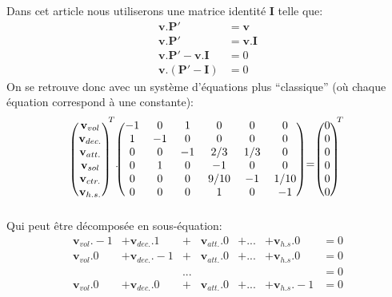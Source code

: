 \documentclass[letterpaper]{article}
\begin{document}
      Dans cet article nous utiliserons une matrice identité $\mathbf{I}$ telle que:
      \begin{align*}
       \mathbf{v} . \mathbf{P}' &= \mathbf{v}\\
       \mathbf{v} . \mathbf{P}' &= \mathbf{v} . \mathbf{I}\\
       \mathbf{v} . \mathbf{P}' - \mathbf{v}. \mathbf{I} &= 0\\
       \mathbf{v} . (\mathbf{P}' - \mathbf{I}) &= 0
      \end{align*}
      On se retrouve donc avec un système d'équations plus ``classique'' (où chaque
      équation correspond à une constante):
      $$\begin{blockarray}{(c)}
	  \mathbf{v}_{vol}\\
	  \mathbf{v}_{dec.}\\
	  \mathbf{v}_{att.}\\
	  \mathbf{v}_{sol}\\
	  \mathbf{v}_{ctr.}\\
	  \mathbf{v}_{h.s.}
	\end{blockarray}^T .
	\begin{blockarray}{(cccccc)}
	    -1 & 0  & 1  & 0    & 0   & 0    \\
	    1  & -1 & 0  & 0    & 0   & 0    \\
	    0  & 0  & -1 & 2/3  & 1/3 & 0    \\
	    0  & 1  & 0  & -1   & 0   & 0    \\
	    0  & 0  & 0  & 9/10 & -1  & 1/10 \\
	    0  & 0  & 0  & 1    & 0   & -1    \\
	\end{blockarray}
	=
	\begin{blockarray}{(c)}
	  0\\
	  0\\
	  0\\
	  0\\
	  0\\
	  0
	\end{blockarray}^T$$
      Qui peut être décomposée en sous-équation:
      \begin{align*}
       \mathbf{v}_{vol} . -1 &+ \mathbf{v}_{dec.} . 1 &+ &\mathbf{v}_{att.} . 0 &+ ... &+ \mathbf{v}_{h.s} . 0 &= 0\\
       \mathbf{v}_{vol} . 0 &+ \mathbf{v}_{dec.} . -1 &+ &\mathbf{v}_{att.} . 0 &+ ... &+ \mathbf{v}_{h.s} . 0 &= 0\\
       & & ... & & & &= 0\\
       \mathbf{v}_{vol} . 0 &+ \mathbf{v}_{dec.} . 0 &+ &\mathbf{v}_{att.} . 0 &+ ... &+ \mathbf{v}_{h.s} . -1 &= 0\\
      \end{align*}
\end{document}
